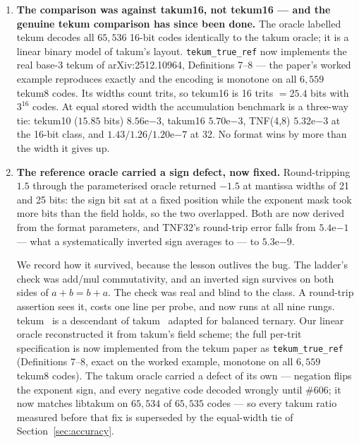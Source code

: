 \begin{enumerate}[leftmargin=*]
\item \textbf{The comparison was against takum16, not tekum16 --- and the
genuine tekum comparison has since been done.} The oracle labelled tekum
decodes all $65{,}536$ 16-bit codes identically to the takum oracle; it is a
linear binary model of takum's layout. \texttt{tekum\_true\_ref} now
implements the real base-3 tekum of arXiv:2512.10964, Definitions 7--8 --- the
paper's worked example reproduces exactly and the encoding is monotone on all
$6{,}559$ tekum8 codes. Its widths count trits, so tekum16 is 16 trits
$= 25.4$ bits with $3^{16}$ codes. At equal stored width the accumulation
benchmark is a three-way tie: tekum10 ($15.85$ bits) $8.56\mathrm{e}{-3}$,
takum16 $5.70\mathrm{e}{-3}$, TNF(4,8) $5.32\mathrm{e}{-3}$ at the 16-bit
class, and $1.43/1.26/1.20\mathrm{e}{-7}$ at 32. No format wins by more than
the width it gives up.

\item \textbf{The reference oracle carried a sign defect, now fixed.} Round-tripping
$1.5$ through the parameterised oracle returned $-1.5$ at mantissa widths of 21
and 25 bits: the sign bit sat at a fixed position while the exponent mask took
more bits than the field holds, so the two overlapped. Both are now derived from
the format parameters, and TNF32's round-trip error falls from
$5.4\mathrm{e}{-1}$ --- what a systematically inverted sign averages to --- to
$5.3\mathrm{e}{-9}$.

We record how it survived, because the lesson outlives the bug. The ladder's
check was add/mul commutativity, and an inverted sign survives on both sides of
$a+b=b+a$. The check was real and blind to the class. A round-trip assertion sees
it, costs one line per probe, and now runs at all nine rungs. tekum~\cite{tekum} is a descendant of takum~\cite{takum} adapted for balanced
ternary. Our
linear oracle reconstructed it from takum's field scheme; the full per-trit
specification is now implemented from the tekum paper as
\texttt{tekum\_true\_ref} (Definitions 7--8, exact on the worked example,
monotone on all $6{,}559$ tekum8 codes). The takum oracle carried a defect of
its own --- negation flips the exponent sign, and every negative code decoded
wrongly until \#606; it now matches libtakum on $65{,}534$ of $65{,}535$ codes
--- so every takum ratio measured before that fix is superseded by the
equal-width tie of Section~\ref{sec:accuracy}.


\end{enumerate}

